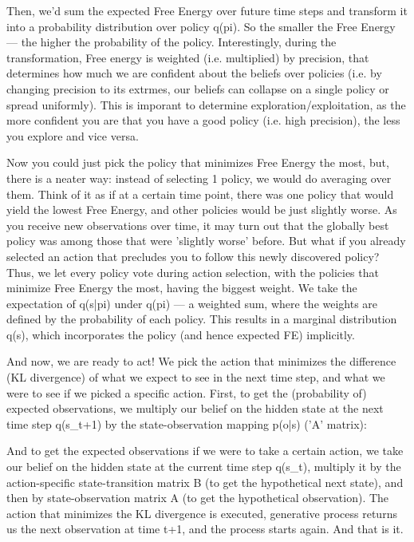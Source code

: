 \documentclass[12pt]{article}
\begin{document}
Then, we'd sum the expected Free Energy over future time steps and transform it into a probability distribution over policy q(pi). So the smaller the Free Energy — the higher the probability of the policy. Interestingly, during the transformation, Free energy is weighted (i.e. multiplied) by precision, that determines how much we are confident about the beliefs over policies (i.e. by changing precision to its extrmes, our beliefs can collapse on a single policy or spread uniformly). This is imporant to determine exploration/exploitation, as the more confident you are that you have a good policy (i.e. high precision), the less you explore and vice versa.

Now you could just pick the policy that minimizes Free Energy the most, but, there is a neater way: instead of selecting 1 policy, we would do averaging over them. Think of it as if at a certain time point, there was one policy that would yield the lowest Free Energy, and other policies would be just slightly worse. As you receive new observations over time, it may turn out that the globally best policy was among those that were 'slightly worse' before. But what if you already selected an action that precludes you to follow this newly discovered policy? Thus, we let every policy vote during action selection, with the policies that minimize Free Energy the most, having the biggest weight. We take the expectation of q(s|pi) under q(pi) — a weighted sum, where the weights are defined by the probability of each policy. This results in a marginal distribution q(s), which incorporates the policy (and hence expected FE) implicitly.

And now, we are ready to act! We pick the action that minimizes the difference (KL divergence) of what we expect to see in the next time step, and what we were to see if we picked a specific action. First, to get the (probability of) expected observations, we multiply our belief on the hidden state at the next time step q(s\_t+1) by the state-observation mapping p(o|s) ('A' matrix):

And to get the expected observations if we were to take a certain action, we take our belief on the hidden state at the current time step q(s\_t), multiply it by the action-specific state-transition matrix B (to get the hypothetical next state), and then by state-observation matrix A (to get the hypothetical observation). The action that minimizes the KL divergence is executed, generative process returns us the next observation at time t+1, and the process starts again. And that is it.
\end{document}
